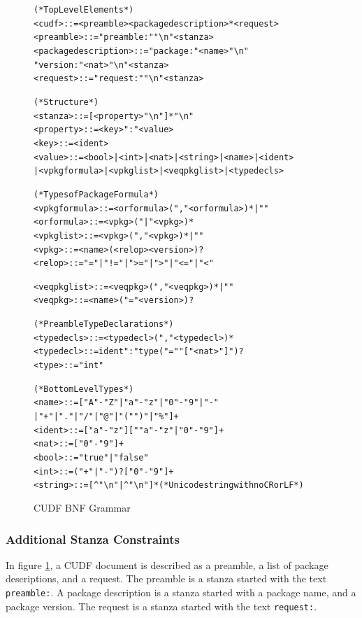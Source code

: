 \begin{figure}[htp] 
\begin{center}
\begin{alltt}
(* Top Level Elements *)
<cudf> ::= <preamble> <packagedescription>* <request>
<preamble> ::= "preamble:" "\textbackslash{}n" <stanza>
<packagedescription> ::= "package:" <name> "\textbackslash{}n" \\    "version:" <nat> "\textbackslash{}n" <stanza>
<request> ::= "request:" "\textbackslash{}n" <stanza>

(* Structure *)
<stanza> ::= [<property> "\textbackslash{}n"]* "\textbackslash{}n"
<property> ::= <key> ":" <value>
<key> ::= <ident>
<value> ::= <bool> | <int> | <nat> | <string> | <name> | <ident> \\    | <vpkgformula> | <vpkglist> | <veqpkglist> | <typedecls>

(* Types of Package Formula *)
<vpkgformula> ::= <orformula> ("," <orformula>)* | ""
<orformula> ::= <vpkg> ("|" <vpkg>)*
<vpkglist> ::= <vpkg> ("," <vpkg>)* | ""
<vpkg> ::= <name> (<relop> <version>)?
<relop> ::= "=" | "!=" | ">=" | ">" | "<=" | "<"

<veqpkglist> ::= <veqpkg> ("," <veqpkg>)* | ""
<veqpkg> ::= <name> ("=" <version>)?

(* Preamble Type Declarations *)
<typedecls> ::= <typedecl> ("," <typedecl>)*
<typedecl> ::= ident ":" type ("=" "["<nat>"]")?
<type> ::= "int"

(* Bottom Level Types *)
<name> ::= ["A"-"Z" | "a"-"z" | "0"-"9" | "-" \\    | "+" | "." | "/" | "@" | "(" ")" | "\%"]+
<ident> ::= ["a"-"z"][""a"-"z" | "0"-"9"]+		
<nat> ::= ["0"-"9"]+
<bool> ::= "true" | "false"
<int> ::= ("+"|"-")? ["0"-"9"]+
<string> ::= [^"\textbackslash{}n"| ^"\textbackslash{}n"]* (*Unicode string with no CR or LF*)
\end{alltt}
  \caption{CUDF BNF Grammar}
  \label{formal.cudfBNFgrammar}
\end{center}
\end{figure}

\subsubsection{Additional Stanza Constraints}
In figure \ref{formal.cudfBNFgrammar}, a CUDF document is described as a preamble, a list of package descriptions, and a request.
The preamble is a stanza started with the text \verb+preamble:+.
A package description is a stanza started with a package name, and a package version.
The request is a stanza started with the text \verb+request:+.

